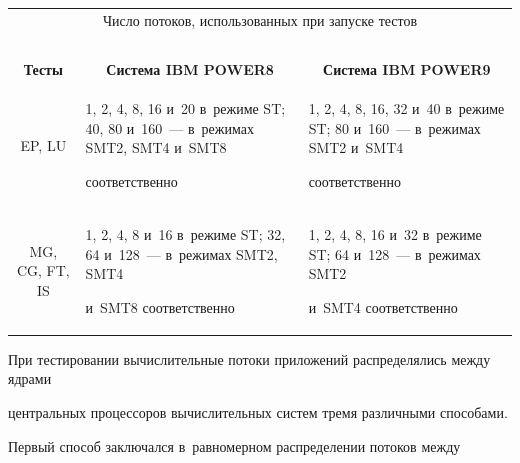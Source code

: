 \begin{table}\small


\begin{center}





\begin{tabular}{|c|p{131pt}|p{131pt}|}


\multicolumn{3}{c}{Число потоков, использованных при запуске тестов}\\


\multicolumn{3}{c}{\ }\\[-6pt]


\hline


\textbf{Тесты}&\multicolumn{1}{c|}{\textbf{Система IBM POWER8}}& 


\multicolumn{1}{|c|}{\textbf{Система IBM POWER9}}\\


\hline


EP, LU&1, 2, 4, 8, 16 и~20 в~режиме ST; 40, 80 и~160~--- в~режимах SMT2, SMT4 и~SMT8 


соответственно&1, 2, 4, 8, 16, 32 и~40 в~режиме ST; 80 и~160~--- в~режимах SMT2 и~SMT4 


соответственно\\


\hline


MG, CG, FT, IS&1, 2, 4, 8 и~16 в~режиме ST; 32, 64 и~128~--- в~режимах SMT2, SMT4 


и~SMT8 соответственно&1, 2, 4, 8, 16 и~32 в~режиме ST; 64 и~128~--- в~режимах SMT2 


и~SMT4 соответственно\\


\hline


\end{tabular}


\end{center}


\vspace*{-9pt}


\end{table}





При тестировании вычислительные потоки приложений распределялись между ядрами 


центральных процессоров вычислительных систем тремя различными способами. 


Первый способ заключался в~равномерном распределении потоков между 


